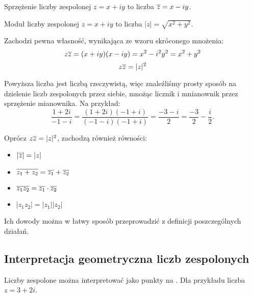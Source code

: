 \documentclass[11pt]{scrartcl}
\begin{document}
    \begin{definition}
        Sprzężenie liczby zespolonej $z = x + iy$ to liczba $\overline{z} = x - iy$.
    \end{definition}

    \begin{definition}
        \label{d:magnitude}
        Moduł liczby zespolonej $z = x + iy$ to liczba $|z| = \sqrt{x^2 + y^2}$.
    \end{definition}

    Zachodzi pewna własność, wynikająca ze wzoru skróconego mnożenia:
    $$ z\overline{z} = (x + iy)(x - iy) = x^2 - i^2y^2 = x^2 + y^2 $$
    \begin{equation}
        z\overline{z} = |z|^2
    \end{equation}

    Powyższa liczba jest liczbą rzeczywistą, więc znaleźliśmy prosty sposób na dzielenie liczb zespolonych przez siebie, mnożąc licznik i mnianownik przez sprzężenie mianownika. Na przykład:
    $$ \frac{1 + 2i}{-1 - i} = \frac{(1 + 2i)(-1 + i)}{(-1 - i)(-1 + i)} = \frac{-3 -i}{2} = \frac{-3}{2} - \frac{i}{2}. $$

    \begin{lemma}
        Oprócz $z\overline{z} = |z|^2$, zachodzą również równości:
        \begin{itemize}
            \item $|\overline{z}| = |z|$
            \item $\overline{z_1 + z_2} = \overline{z_1} + \overline{z_2}$
            \item $\overline{z_1z_2} = \overline{z_1}\cdot\overline{z_2}$
            \item $|z_1z_2| = |z_1||z_2|$
        \end{itemize}
    \end{lemma}
    Ich dowody można w łatwy sposób przeprowadzić z definicji poszczególnych działań.

    \subsection{Interpretacja geometryczna liczb zespolonych}
    Liczby zespolone można interpretować jako punkty na . Dla przykładu liczba $z = 3 + 2i$.

    \begin{center}
    \end{center}
\end{document}
